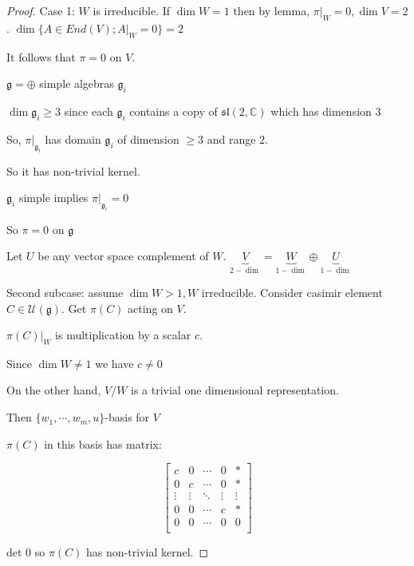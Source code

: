 \documentclass{article}
\theoremstyle{definition}
\begin{document}
\begin{proof}
    Case 1: \(W\) is irreducible. If \(\dim W = 1\) then by lemma, \(\pi|_W = 0, \dim V = 2\). \(\dim \{ A\in End(V);A|_W = 0 \} = 2 \)

    It follows that \(\pi = 0\) on \(V\).
    
    \(\mathfrak{g} = \oplus\) simple algebras \(\mathfrak{g}_i\)
    
    \(\dim \mathfrak{g}_i \geq 3\) since each \(\mathfrak{g}_i\) contains a copy of \(\mathfrak{sl}(2,\mathbb{C})\) which has dimension \(3\) 
    
    So, \(\pi|_{\mathfrak{g}_i}\) has domain \(\mathfrak{g}_i\) of dimension \(\geq 3\) and range \(2\).
    
    So it has non-trivial kernel.

    \(\mathfrak{g}_i\) simple implies \(\pi|_{\mathfrak{g}_i}=0\)
    
    So \(\pi =0\) on \(\mathfrak{g}\)  
   
    Let \(U\) be any vector space complement of \(W\). \(\underbrace{V}_{2-\dim}=\underbrace{W}_{1-\dim}\oplus\underbrace{U}_{1-\dim}\) 
    
    Second subcase: assume \(\dim W > 1, W\) irreducible. Consider casimir element \(C\in \mathcal{U}(\mathfrak{g})\). Get \(\pi(C)\) acting on \(V\).
    
    \(\pi(C)|_W\) is multiplication by a scalar \(c\).
    
    Since \(\dim W \neq 1\) we have \(c \neq 0\)
    
    On the other hand, \(V / W\) is a trivial one dimensional representation.
    
    Then \(\{ w_1,\cdots, w_m, u \} \)-basis for \(V\) 

    \(\pi(C)\) in this basis has matrix:
    
    \[
        \begin{bmatrix}
            c & 0 & \cdots & 0 & \ast \\
            0 & c & \cdots & 0 & \ast \\
            \vdots & \vdots & \ddots & \vdots & \vdots \\
            0 & 0 & \cdots & c & \ast\\
            0 & 0 & \cdots & 0 & 0  \\
        \end{bmatrix}
    \]

    det \(0\) so \(\pi(C)\) has non-trivial kernel.
    

\end{proof}
\end{document}
